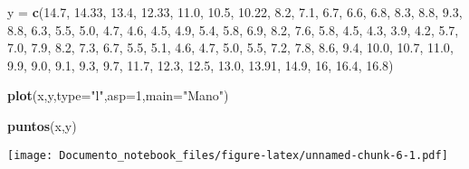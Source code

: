 \documentclass[]{article}
\newenvironment{Shaded}{\begin{snugshade}}{\end{snugshade}}
\newcommand{\KeywordTok}[1]{\textcolor[rgb]{0.13,0.29,0.53}{\textbf{#1}}}
\newcommand{\DataTypeTok}[1]{\textcolor[rgb]{0.13,0.29,0.53}{#1}}
\newcommand{\DecValTok}[1]{\textcolor[rgb]{0.00,0.00,0.81}{#1}}
\newcommand{\FloatTok}[1]{\textcolor[rgb]{0.00,0.00,0.81}{#1}}
\newcommand{\StringTok}[1]{\textcolor[rgb]{0.31,0.60,0.02}{#1}}
\newcommand{\NormalTok}[1]{#1}
\begin{document}
\begin{Shaded}
\begin{Highlighting}[]
\NormalTok{y =}\StringTok{ }\KeywordTok{c}\NormalTok{(}\FloatTok{14.7}\NormalTok{, }\FloatTok{14.33}\NormalTok{, }\FloatTok{13.4}\NormalTok{, }\FloatTok{12.33}\NormalTok{, }\FloatTok{11.0}\NormalTok{, }\FloatTok{10.5}\NormalTok{, }\FloatTok{10.22}\NormalTok{, }\FloatTok{8.2}\NormalTok{, }\FloatTok{7.1}\NormalTok{, }\FloatTok{6.7}\NormalTok{, }\FloatTok{6.6}\NormalTok{, }
  \FloatTok{6.8}\NormalTok{, }\FloatTok{8.3}\NormalTok{, }\FloatTok{8.8}\NormalTok{, }\FloatTok{9.3}\NormalTok{, }\FloatTok{8.8}\NormalTok{, }
  \FloatTok{6.3}\NormalTok{, }\FloatTok{5.5}\NormalTok{, }\FloatTok{5.0}\NormalTok{, }\FloatTok{4.7}\NormalTok{, }\FloatTok{4.6}\NormalTok{, }\FloatTok{4.5}\NormalTok{, }\FloatTok{4.9}\NormalTok{, }\FloatTok{5.4}\NormalTok{, }\FloatTok{5.8}\NormalTok{, }\FloatTok{6.9}\NormalTok{, }\FloatTok{8.2}\NormalTok{, }\FloatTok{7.6}\NormalTok{, }
  \FloatTok{5.8}\NormalTok{, }\FloatTok{4.5}\NormalTok{, }\FloatTok{4.3}\NormalTok{, }\FloatTok{3.9}\NormalTok{, }\FloatTok{4.2}\NormalTok{, }\FloatTok{5.7}\NormalTok{, }\FloatTok{7.0}\NormalTok{, }\FloatTok{7.9}\NormalTok{, }\FloatTok{8.2}\NormalTok{, }\FloatTok{7.3}\NormalTok{, }
  \FloatTok{6.7}\NormalTok{, }\FloatTok{5.5}\NormalTok{, }\FloatTok{5.1}\NormalTok{, }\FloatTok{4.6}\NormalTok{, }\FloatTok{4.7}\NormalTok{, }\FloatTok{5.0}\NormalTok{, }\FloatTok{5.5}\NormalTok{, }\FloatTok{7.2}\NormalTok{, }\FloatTok{7.8}\NormalTok{, }\FloatTok{8.6}\NormalTok{, }\FloatTok{9.4}\NormalTok{, }\FloatTok{10.0}\NormalTok{,  }\FloatTok{10.7}\NormalTok{, }\FloatTok{11.0}\NormalTok{, }
  \FloatTok{9.9}\NormalTok{, }\FloatTok{9.0}\NormalTok{, }\FloatTok{9.1}\NormalTok{, }\FloatTok{9.3}\NormalTok{, }\FloatTok{9.7}\NormalTok{, }\FloatTok{11.7}\NormalTok{, }
  \FloatTok{12.3}\NormalTok{, }\FloatTok{12.5}\NormalTok{, }\FloatTok{13.0}\NormalTok{, }\FloatTok{13.91}\NormalTok{, }\FloatTok{14.9}\NormalTok{, }\DecValTok{16}\NormalTok{, }\FloatTok{16.4}\NormalTok{, }\FloatTok{16.8}\NormalTok{)}


\KeywordTok{plot}\NormalTok{(x,y,}\DataTypeTok{type=}\StringTok{"l"}\NormalTok{,}\DataTypeTok{asp=}\DecValTok{1}\NormalTok{,}\DataTypeTok{main=}\StringTok{"Mano"}\NormalTok{)}

\KeywordTok{puntos}\NormalTok{(x,y)}
\end{Highlighting}
\end{Shaded}

\texttt{[image: Documento\_notebook\_files/figure-latex/unnamed-chunk-6-1.pdf]}
\end{document}
